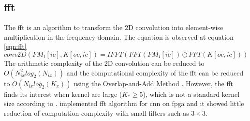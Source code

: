 \subsection{\acrfull{fft}}
%
%
The \acrshort{fft} is an algorithm to transform the 2D convolution into element-wise multiplication in the frequency domain. The equation is observed at equation \ref{eqn:fft}
\begin{equation}
\label{eqn:fft}
conv2D(FM_{I}[ic], K[oc, ic]) = IFFT( FFT(FM_{I}[ic]) \odot FFT(K[oc, ic]) )
\end{equation}
The arithmetic complexity of the 2D convolution can be reduced to $O(N_{ix}^2 log_2(N_{ix}))$ \cite{jong_hwan_ko_design_2017} and the computational complexity of the \acrshort{fft} can be reduced to $O(N_{ix} log_2(K_{x}))$ using the Overlap-and-Add Method \cite{w_smith_scientist_1997}.
However, the \acrshort{fft} finds its interest when kernel are large \cite{lavin_fast_2015} ($K_* \geq 5$), which is not a standard kernel size according to \cite{sandler_mobilenetv2_2019}. \cite{zhang_frequency_2017} implemented \acrshort{fft} algorithm for \acrshort{cnn} on \acrshort{fpga} and it showed little reduction of computation complexity with small filters such as $3 \times 3$.
